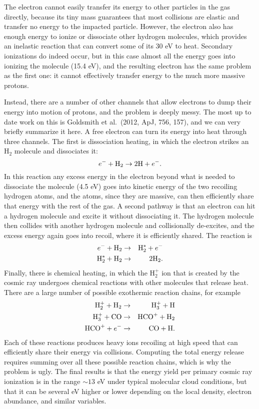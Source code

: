 The electron cannot easily transfer its energy to other particles in the gas directly, because its tiny mass guarantees that most collisions are elastic and transfer no energy to the impacted particle. However, the electron also has enough energy to ionize or dissociate other hydrogen molecules, which provides an inelastic reaction that can convert some of its 30 eV to heat. Secondary ionizations do indeed occur, but in this case almost all the energy goes into ionizing the molecule (15.4 eV), and the resulting electron has the same problem as the first one: it cannot effectively transfer energy to the much more massive protons.

Instead, there are a number of other channels that allow electrons to dump their energy into motion of protons, and the problem is deeply messy. The most up to date work on this is Goldsmith et al.~(2012, ApJ, 756, 157), and we can very briefly summarize it here. A free electron can turn its energy into heat through three channels. The first is dissociation heating, in which the electron strikes an H$_2$ molecule and dissociates it:
\begin{equation}
e^- + {\rm H}_2 \rightarrow 2{\rm H} + e^{-}.
\end{equation}
In this reaction any excess energy in the electron beyond what is needed to dissociate the molecule (4.5 eV) goes into kinetic energy of the two recoiling hydrogen atoms, and the atoms, since they are massive, can then efficiently share that energy with the rest of the gas. A second pathway is that an electron can hit a hydrogen molecule and excite it without dissociating it. The hydrogen molecule then collides with another hydrogen molecule and collisionally de-excites, and the excess energy again goes into recoil, where it is efficiently shared. The reaction is
\begin{eqnarray}
e^- + {\rm H}_2 & \rightarrow & {\rm H}_2^* + e^{-} \\
{\rm H}_2^* + {\rm H}_2 & \rightarrow & 2 {\rm H}_2.
\end{eqnarray}
Finally, there is chemical heating, in which the H$_2^+$ ion that is created by the cosmic ray undergoes chemical reactions with other molecules that release heat. There are a large number of possible exothermic reaction chains, for example
\begin{eqnarray}
{\rm H}_2^+ + {\rm H}_2 & \rightarrow & {\rm H}_3^+ + {\rm H} \\
{\rm H}_3^+ + {\rm CO} & \rightarrow & {\rm HCO}^+ + {\rm H}_2 \\
{\rm HCO}^+ + e^- & \rightarrow & {\rm CO} + {\rm H}.
\end{eqnarray}
Each of these reactions produces heavy ions recoiling at high speed that can efficiently share their energy via collisions. Computing the total energy release requires summing over all these possible reaction chains, which is why the problem is ugly. The final results is that the energy yield per primary cosmic ray ionization is in the range $\sim 13$ eV under typical molecular cloud conditions, but that it can be several eV higher or lower depending on the local density, electron abundance, and similar variables.

